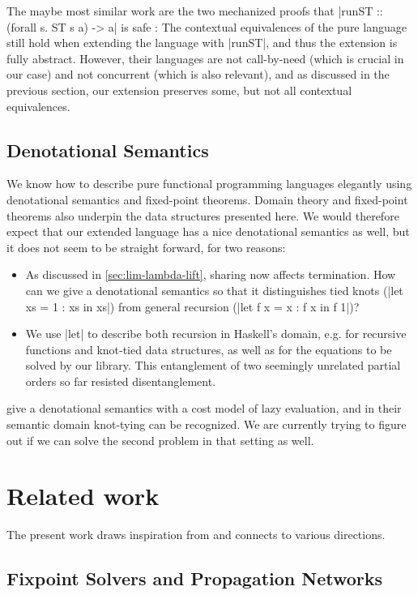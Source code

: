 \documentclass[manuscript,screen,acmsmall,nonacm]{acmart}
\begin{document}
The maybe most similar work are the two mechanized proofs that |runST :: (forall s. ST s a) -> a| is safe \citep{runST,runST2}: The contextual equivalences of the pure language still hold when extending the language with |runST|, and thus the extension is fully abstract.  However, their languages are not call-by-need (which is crucial in our case) and not concurrent (which is also relevant), and as discussed in the previous section, our extension preserves some, but not all contextual equivalences.

\subsection{Denotational Semantics}\label{sec:denotational}

We know how to describe pure functional programming languages elegantly using denotational semantics and fixed-point theorems. Domain theory and fixed-point theorems also underpin the data structures presented here. We would therefore expect that our extended language has a nice denotational semantics as well, but it does not seem to be straight forward, for two reasons:
\begin{itemize}
\item As discussed in \cref{sec:lim-lambda-lift}, sharing now affects termination. How can we give a denotational semantics so that it distinguishes tied knots (|let xs = 1 : xs in xs|) from general recursion (|let f x = x : f x in f 1|)?
\item We use |let| to describe both recursion in Haskell's domain, e.g. for recursive functions and knot-tied data structures, as well as for the equations to be solved by our library. This entanglement of two seemingly unrelated partial orders so far resisted disentanglement.
\end{itemize}
 give a denotational semantics with a cost model of lazy evaluation, and in their semantic domain knot-tying can be recognized. We are currently trying to figure out if we can solve the second problem in that setting as well.

\section{Related work}\label{sec:related}

The present work draws inspiration from and connects to various directions.

\subsection{Fixpoint Solvers and Propagation Networks}
\end{document}
